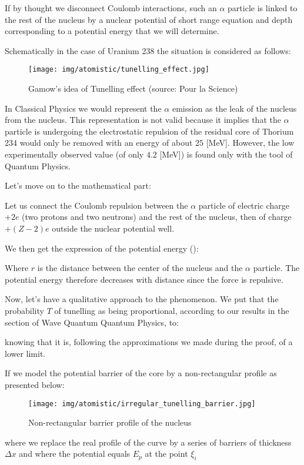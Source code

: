 	If by thought we disconnect Coulomb interactions, such an $\alpha$ particle is linked to the rest of the nucleus by a nuclear potential of short range equation and depth corresponding to a potential energy that we will determine.

	Schematically in the case of Uranium 238 the situation is considered as follows:
	\begin{figure}[H]
		\centering
		\texttt{[image: img/atomistic/tunelling\_effect.jpg]}
		\caption[Gamow's idea of Tunelling effect]{Gamow's idea of Tunelling effect (source: Pour la Science)}
	\end{figure}
	In Classical Physics we would represent the $\alpha$ emission as the leak of the nucleus from the nucleus. This representation is not valid because it implies that the $\alpha$ particle is undergoing the electrostatic repulsion of the residual core of Thorium 234 would only be removed with an energy of about $25$ [MeV]. However, the low experimentally observed value (of only $4.2$ [MeV]) is found only with the tool of Quantum Physics.
	
	Let's move on to the mathematical part:
	
	Let us connect the Coulomb repulsion between the $\alpha$ particle of electric charge $+2e$ (two protons and two neutrons) and the rest of the nucleus, then of charge $+(Z-2)e$ outside the nuclear potential well.

	We then get the expression of the potential energy ():
	
	Where $r$ is the distance between the center of the nucleus and the $\alpha$ particle. The potential energy therefore decreases with distance since the force is repulsive.

	Now, let's have a qualitative approach to the phenomenon. We put that the probability $T$ of tunelling as being proportional, according to our results in the section of Wave Quantum Quantum Physics, to:

	
	knowing that it is, following the approximations we made during the proof, of a lower limit.

	If we model the potential barrier of the core by a non-rectangular profile as presented below:
	\begin{figure}[H]
		\centering
		\texttt{[image: img/atomistic/irregular\_tunelling\_barrier.jpg]}
		\caption{Non-rectangular barrier profile of the nucleus}
	\end{figure}
	where we replace the real profile of the curve by a series of barriers of thickness $\Delta x$ and where the potential equals $E_p$ at the point $\xi_i$

